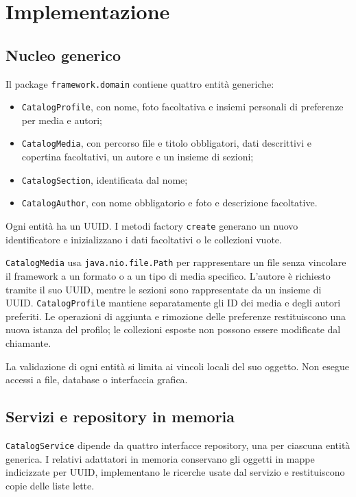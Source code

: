 \chapter{Implementazione}

\section{Nucleo generico}
Il package \texttt{framework.domain} contiene quattro entità generiche:
\begin{itemize}
  \item \texttt{CatalogProfile}, con nome, foto facoltativa e insiemi personali di preferenze per media e autori;
  \item \texttt{CatalogMedia}, con percorso file e titolo obbligatori, dati descrittivi e copertina facoltativi, un autore e un insieme di sezioni;
  \item \texttt{CatalogSection}, identificata dal nome;
  \item \texttt{CatalogAuthor}, con nome obbligatorio e foto e descrizione facoltative.
\end{itemize}

Ogni entità ha un UUID. I metodi factory \texttt{create} generano un nuovo identificatore e inizializzano i dati facoltativi o le collezioni vuote.

\texttt{CatalogMedia} usa \texttt{java.nio.file.Path} per rappresentare un file senza vincolare il framework a un formato o a un tipo di media specifico. L'autore è richiesto tramite il suo UUID, mentre le sezioni sono rappresentate da un insieme di UUID. \texttt{CatalogProfile} mantiene separatamente gli ID dei media e degli autori preferiti. Le operazioni di aggiunta e rimozione delle preferenze restituiscono una nuova istanza del profilo; le collezioni esposte non possono essere modificate dal chiamante.

La validazione di ogni entità si limita ai vincoli locali del suo oggetto. Non esegue accessi a file, database o interfaccia grafica.

\section{Servizi e repository in memoria}
\texttt{CatalogService} dipende da quattro interfacce repository, una per ciascuna entità generica. I relativi adattatori in memoria conservano gli oggetti in mappe indicizzate per UUID, implementano le ricerche usate dal servizio e restituiscono copie delle liste lette.

